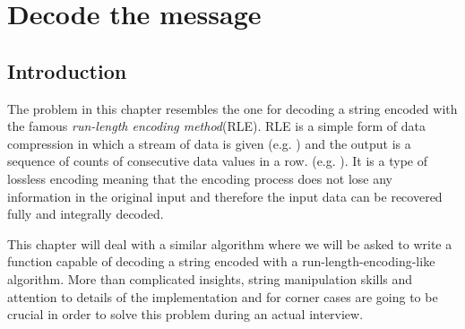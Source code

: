 %



\chapter{Decode the message}
\label{ch:decode_string}
\section*{Introduction}
The problem in this chapter resembles the one for decoding a string encoded with the famous \textit{run-length
encoding method}(RLE).
RLE is a simple form of data compression in which a stream of data is
given (e.g. ) and the output is a sequence of counts of consecutive
data values in a row. (e.g. ).
It is a type of lossless encoding meaning that the encoding
process does not lose any information in the original input and therefore the input data can be recovered fully and integrally decoded. 

This chapter will deal with a similar algorithm where we will be asked to write a function capable of decoding a string encoded with a run-length-encoding-like algorithm. More than complicated insights, string manipulation skills and attention to details of the implementation and for corner cases are going to be crucial in order to solve this problem during an actual interview. 


